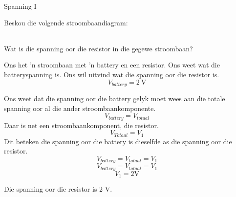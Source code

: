 \begin{wex}{Spanning I}{
Beskou die volgende stroombaandiagram:\\
\begin{center}
\end{center}\\
Wat is die spanning oor die resistor in die gegewe stroombaan?
}{%
Ons het 'n stroombaan met 'n battery en een resistor. Ons weet wat die
batteryspanning is. Ons wil uitvind wat die spanning oor die resistor is.
\begin{equation*}
V_{battery} = 2~\text{V}
\end{equation*}

Ons weet dat die spanning oor die battery gelyk moet wees aan die totale
spanning oor al die ander stroombaankomponente.
\begin{equation*}
V_{battery} = V_{totaal}
\end{equation*}
Daar is net een stroombaankomponent, die resistor.
\begin{equation*}
V_{Totaal} = V_{1}
\end{equation*}
Dit beteken die spanning oor die battery is dieselfde as die spanning oor
die resistor.
\begin{equation*}
V_{battery} = V_{totaal} = V_{1}
\end{equation*}
\begin{equation*}
V_{battery} = V_{totaal} = V_{1}
\end{equation*}
\begin{equation*}
V_{1} = 2\text{V}
\end{equation*}

Die spanning oor die resistor is 2 V.


}\end{wex}

